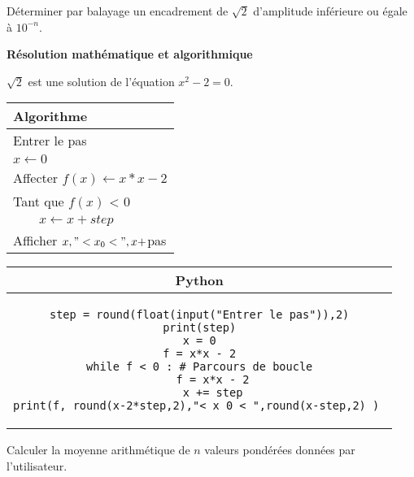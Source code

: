 \begin{ExC}{Déterminer par balayage un encadrement de $\sqrt{2}$ d’amplitude inférieure ou égale à $10^{-n}$. }

\vspace{0.4cm}

\textbf{Résolution mathématique et algorithmique}

$\sqrt{2}$ est une solution de l'équation $x^2-2=0$. 

\vspace{0.4cm}

\begin{minipage}{0.3\linewidth}

\begin{tabular}{|l|}
\hline 
Algorithme \\ 
\hline 
Entrer le pas  \\ 
$x \leftarrow 0$ \\
Affecter $f(x) \leftarrow x*x-2 $ \\
Tant que $f(x)$ < 0 \\
$ \quad \quad	x \leftarrow x +step $ \\
Afficher  $x ,"< x_0 < ",x + $pas\\
\hline 
\end{tabular} 
  
 
\end{minipage}
\begin{minipage}{0.5\linewidth}
\begin{tabular}{|c|}
\hline 
Python \\ 
\hline 
\begin{lstlisting}
step = round(float(input("Entrer le pas")),2)
print(step)
x = 0
f = x*x - 2
while f < 0 : # Parcours de boucle
    f = x*x - 2
    x += step
print(f, round(x-2*step,2),"< x_0 < ",round(x-step,2) ) 
\end{lstlisting}\\
\hline 
\end{tabular} 
\end{minipage}

\end{ExC}



 
 
 
\begin{ExD} 

Calculer la moyenne arithmétique de $n$ valeurs pondérées données par l'utilisateur.
\end{ExD}




